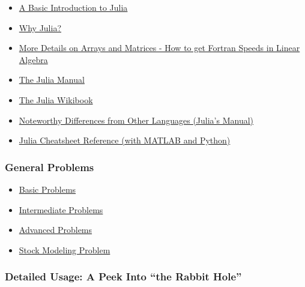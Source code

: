 \documentclass[11pt]{article}
\begin{document}
\begin{itemize}
\itemsep1pt\parskip0pt
\item
  \href{http://ucidatascienceinitiative.github.io/IntroToJulia/Html/BasicIntroduction}{A
  Basic Introduction to Julia}
\item
  \href{http://ucidatascienceinitiative.github.io/IntroToJulia/Html/WhyJulia}{Why
  Julia?}
\item
  \href{http://ucidatascienceinitiative.github.io/IntroToJulia/Html/ArraysAndMatrices}{More
  Details on Arrays and Matrices - How to get Fortran Speeds in Linear
  Algebra}
\item
  \href{https://docs.julialang.org/en/stable/}{The Julia Manual}
\item
  \href{https://en.wikibooks.org/wiki/Introducing_Julia}{The Julia
  Wikibook}
\item
  \href{https://docs.julialang.org/en/stable/manual/noteworthy-differences/}{Noteworthy
  Differences from Other Languages (Julia's Manual)}
\item
  \href{https://cheatsheets.quantecon.org/}{Julia Cheatsheet Reference
  (with MATLAB and Python)}
\end{itemize}

\subsubsection{General Problems}\label{general-problems}

\begin{itemize}
\itemsep1pt\parskip0pt
\item
  \href{http://ucidatascienceinitiative.github.io/IntroToJulia/Html/BasicProblems}{Basic
  Problems}
\item
  \href{http://ucidatascienceinitiative.github.io/IntroToJulia/Html/IntermediateProblems}{Intermediate
  Problems}
\item
  \href{http://ucidatascienceinitiative.github.io/IntroToJulia/Html/AdvancedProblems}{Advanced
  Problems}
\item
  \href{http://ucidatascienceinitiative.github.io/IntroToJulia/Html/StockProblem}{Stock
  Modeling Problem}
\end{itemize}

\subsubsection{Detailed Usage: A Peek Into ``the Rabbit
Hole''}\label{detailed-usage-a-peek-into-the-rabbit-hole}
\end{document}
